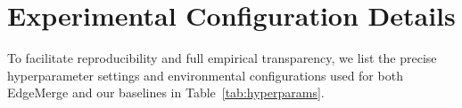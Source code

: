 \documentclass{article}
\theoremstyle{plain}
\theoremstyle{definition}
\theoremstyle{remark}
\begin{document}










\newpage
\appendix
\onecolumn
\section{Experimental Configuration Details}
\label{app:config}

To facilitate reproducibility and full empirical transparency, we list the precise hyperparameter settings and environmental configurations used for both EdgeMerge and our baselines in Table~\ref{tab:hyperparams}.
\end{document}
